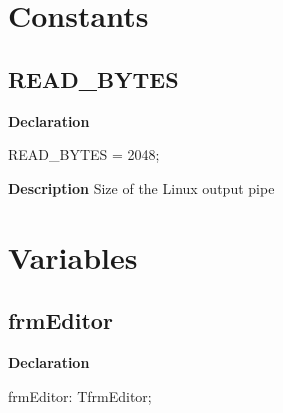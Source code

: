 \documentclass{report}
\newif\ifpdf
\begin{document}
\section{Constants}
\ifpdf
\subsection*{\large{\textbf{READ{\_}BYTES}}\normalsize\hspace{1ex}\hrulefill}
\else
\subsection*{READ{\_}BYTES}
\fi
\label{editor-READ_BYTES}
\begin{list}{}{
\setlength{\itemindent}{0cm}
\setlength{\listparindent}{0cm}
\setlength{\leftmargin}{\evensidemargin}
\addtolength{\leftmargin}{\tmplength}
\settowidth{\labelsep}{X}
\addtolength{\leftmargin}{\labelsep}
\setlength{\labelwidth}{\tmplength}
}
\item[\textbf{Declaration}\hfill]
\ifpdf
\begin{flushleft}
\fi
\begin{ttfamily}
READ{\_}BYTES = 2048;\end{ttfamily}

\ifpdf
\end{flushleft}
\fi

\par
\item[\textbf{Description}]
Size of the Linux output pipe

\end{list}
\section{Variables}
\ifpdf
\subsection*{\large{\textbf{frmEditor}}\normalsize\hspace{1ex}\hrulefill}
\else
\subsection*{frmEditor}
\fi
\label{editor-frmEditor}
\begin{list}{}{
\setlength{\itemindent}{0cm}
\setlength{\listparindent}{0cm}
\setlength{\leftmargin}{\evensidemargin}
\addtolength{\leftmargin}{\tmplength}
\settowidth{\labelsep}{X}
\addtolength{\leftmargin}{\labelsep}
\setlength{\labelwidth}{\tmplength}
}
\item[\textbf{Declaration}\hfill]
\ifpdf
\begin{flushleft}
\fi
\begin{ttfamily}
frmEditor: TfrmEditor;\end{ttfamily}

\ifpdf
\end{flushleft}
\fi

\end{list}
\ifpdf
\end{document}
